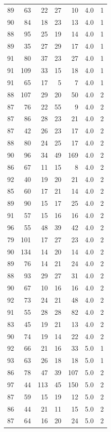 \documentclass[
  11pt,
  a4paper,
]{scrartcl}
\begin{document}
\begin{longtable}[]{@{}rrrrrrl@{}}
89 & 63 & 22 & 27 & 10 & 4.0 & 1 \\
90 & 84 & 18 & 23 & 13 & 4.0 & 1 \\
88 & 95 & 25 & 19 & 14 & 4.0 & 1 \\
89 & 35 & 27 & 29 & 17 & 4.0 & 1 \\
91 & 80 & 37 & 23 & 27 & 4.0 & 1 \\
91 & 109 & 33 & 15 & 18 & 4.0 & 1 \\
91 & 65 & 17 & 5 & 7 & 4.0 & 1 \\
88 & 107 & 29 & 20 & 50 & 4.0 & 2 \\
87 & 76 & 22 & 55 & 9 & 4.0 & 2 \\
87 & 86 & 28 & 23 & 21 & 4.0 & 2 \\
87 & 42 & 26 & 23 & 17 & 4.0 & 2 \\
88 & 80 & 24 & 25 & 17 & 4.0 & 2 \\
90 & 96 & 34 & 49 & 169 & 4.0 & 2 \\
86 & 67 & 11 & 15 & 8 & 4.0 & 2 \\
92 & 40 & 19 & 20 & 21 & 4.0 & 2 \\
85 & 60 & 17 & 21 & 14 & 4.0 & 2 \\
89 & 90 & 15 & 17 & 25 & 4.0 & 2 \\
91 & 57 & 15 & 16 & 16 & 4.0 & 2 \\
96 & 55 & 48 & 39 & 42 & 4.0 & 2 \\
79 & 101 & 17 & 27 & 23 & 4.0 & 2 \\
90 & 134 & 14 & 20 & 14 & 4.0 & 2 \\
89 & 76 & 14 & 21 & 24 & 4.0 & 2 \\
88 & 93 & 29 & 27 & 31 & 4.0 & 2 \\
90 & 67 & 10 & 16 & 16 & 4.0 & 2 \\
92 & 73 & 24 & 21 & 48 & 4.0 & 2 \\
91 & 55 & 28 & 28 & 82 & 4.0 & 2 \\
83 & 45 & 19 & 21 & 13 & 4.0 & 2 \\
90 & 74 & 19 & 14 & 22 & 4.0 & 2 \\
92 & 66 & 21 & 16 & 33 & 5.0 & 1 \\
93 & 63 & 26 & 18 & 18 & 5.0 & 1 \\
86 & 78 & 47 & 39 & 107 & 5.0 & 2 \\
97 & 44 & 113 & 45 & 150 & 5.0 & 2 \\
87 & 59 & 15 & 19 & 12 & 5.0 & 2 \\
86 & 44 & 21 & 11 & 15 & 5.0 & 2 \\
87 & 64 & 16 & 20 & 24 & 5.0 & 2 \\

\end{longtable}
\end{document}
